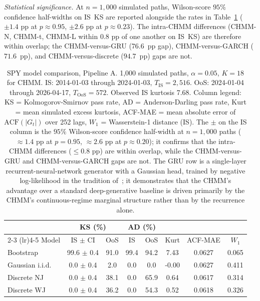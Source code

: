 \documentclass[sigconf,anonymous,nonacm=true]{acmart}
\begin{document}
\emph{Statistical significance.} At $n = 1{,}000$ simulated paths,
Wilson-score $95\%$ confidence half-widths on IS~KS are reported
alongside the rates in Table~\ref{tab:spy_comparison} ($\pm 1.4$ pp at
$p \approx 0.95$, $\pm 2.6$ pp at $p \approx 0.23$). The intra-CHMM
differences (CHMM-N, CHMM-t, CHMM-L within $0.8$ pp of one another on
IS~KS) are therefore within overlap; the CHMM-versus-GRU (76.6~pp gap),
CHMM-versus-GARCH ($71.6$~pp), and CHMM-versus-discrete ($94.7$~pp) gaps
are not.

\begin{table}[t]
\centering
\footnotesize
\caption{SPY model comparison, Pipeline A. 1{,}000 simulated paths,
$\alpha = 0.05$, $K = 18$ for CHMM. IS: 2014-01-03 through 2024-01-03,
$T_{\text{IS}} = 2{,}516$. OoS: 2024-01-04 through 2026-04-17,
$T_{\text{OoS}} = 572$. Observed IS kurtosis 7.68. Column legend:
KS = Kolmogorov-Smirnov pass rate, AD = Anderson-Darling pass rate,
Kurt = mean simulated excess kurtosis,
ACF-MAE = mean absolute error of $\text{ACF}(|G_t|)$ over 252 lags,
$W_1$ = Wasserstein-1 distance (IS).
The $\pm$ on the IS column is the $95\%$ Wilson-score confidence
half-width at $n = 1{,}000$ paths ($\approx 1.4$ pp at $p = 0.95$,
$\approx 2.6$ pp at $p \approx 0.20$); it confirms that the intra-CHMM
differences ($\le 0.8$ pp) are within overlap, while the CHMM-versus-GRU
and CHMM-versus-GARCH gaps are not.
The GRU row is a single-layer recurrent-neural-network generator with a
Gaussian head, trained by negative log-likelihood in the tradition
of~\cite{yoon2019timegan}; it demonstrates that the CHMM's advantage
over a standard deep-generative baseline is driven primarily by the
CHMM's continuous-regime marginal structure rather than by the
recurrence alone.}
\label{tab:spy_comparison}
\begin{tabular}{l cc cc c c c}
\toprule
 & \multicolumn{2}{c}{KS (\%)} & \multicolumn{2}{c}{AD (\%)} & & & \\
\cmidrule(lr){2-3} \cmidrule(lr){4-5}
Model & IS $\pm$ CI & OoS & IS & OoS & Kurt & ACF-MAE & $W_1$ \\
\midrule
Bootstrap         & 99.6 $\pm$ 0.4 & 91.0 & 99.4 & 94.2 & 7.43  & 0.0627 & 0.065 \\
Gaussian i.i.d.   & 0.0 $\pm$ 0.4  & 2.0  & 0.0  & 0.0  & -0.00 & 0.0627 & 0.411 \\
Discrete NJ       & 0.0 $\pm$ 0.4  & 38.1 & 0.0  & 65.9 & 0.64  & 0.0617 & 0.314 \\
Discrete WJ       & 0.0 $\pm$ 0.4  & 36.2 & 0.0  & 54.3 & 0.52  & 0.0618 & 0.326 \\

\end{tabular}
\end{table}
\end{document}
